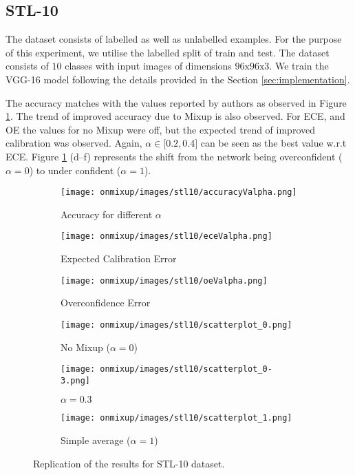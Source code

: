 \documentclass{article}
\begin{document}
\subsection{STL-10}
The dataset consists of labelled as well as unlabelled examples. For the purpose of this experiment, we utilise the labelled split of train and test. The dataset consists of $10$ classes with input images of dimensions $96\text{x}96\text{x}3$. We train the VGG-16 model following the details provided in the Section \ref{sec:implementation}.

The accuracy matches with the values reported by authors as observed in Figure \ref{fig:stl_10}. The trend of improved accuracy due to Mixup is also observed. For ECE, and OE the values for no Mixup were off, but the expected trend of improved calibration was observed. Again, $\alpha \in \lbrack 0.2, 0.4 \rbrack $ can be seen as the best value w.r.t ECE. Figure \ref{fig:stl_10} (d--f) represents the shift from the network being overconfident ($\alpha=0$) to under confident ($\alpha=1$). 

\begin{figure}[h]
     \centering
     \begin{subfigure}[b]{0.31\textwidth}
         \centering
         \texttt{[image: onmixup/images/stl10/accuracyValpha.png]}
         \caption{Accuracy for different $\alpha$}
     \end{subfigure}
     \begin{subfigure}[b]{0.31\textwidth}
         \centering
         \texttt{[image: onmixup/images/stl10/eceValpha.png]}
         \caption{Expected Calibration Error}
     \end{subfigure}
     \begin{subfigure}[b]{0.31\textwidth}
         \centering
         \texttt{[image: onmixup/images/stl10/oeValpha.png]}
         \caption{Overconfidence Error}
     \end{subfigure}
     \begin{subfigure}[b]{0.31\textwidth}
         \centering
         \noindent\texttt{[image: onmixup/images/stl10/scatterplot\_0.png]}
         \caption{No Mixup ($\alpha=0$)}
     \end{subfigure}
     \begin{subfigure}[b]{0.31\textwidth}
         \centering
         \noindent\texttt{[image: onmixup/images/stl10/scatterplot\_0-3.png]}
         \caption{$\alpha=0.3$}
     \end{subfigure}
     \begin{subfigure}[b]{0.31\textwidth}
         \centering
         \noindent\texttt{[image: onmixup/images/stl10/scatterplot\_1.png]}
         \caption{Simple average ($\alpha=1$)}
     \end{subfigure}
        \caption{Replication of the results for STL-10 dataset.}
        \label{fig:stl_10}
\end{figure}
\end{document}
